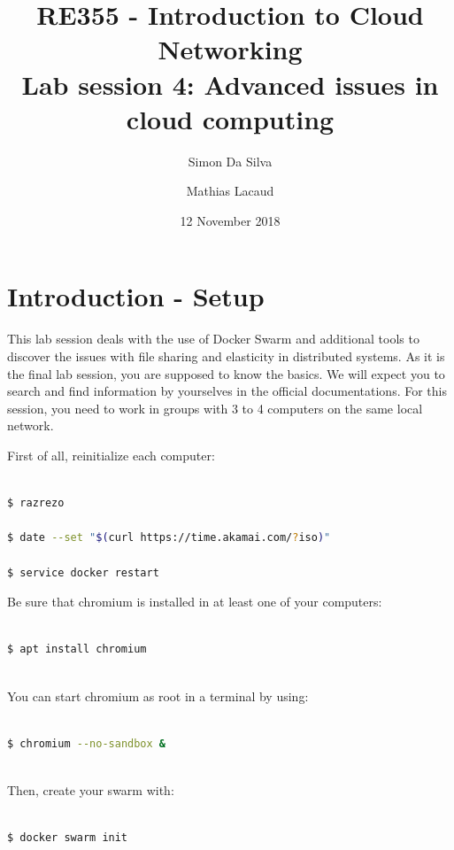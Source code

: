 \documentclass[a4paper,11pt]{exam}
\date{12 November 2018}
\title{RE355 - Introduction to Cloud Networking\\
Lab session 4: Advanced issues in cloud computing}
\author{Simon Da Silva \and Mathias Lacaud}
\begin{document}
\maketitle

\section{Introduction - Setup}

This lab session deals with the use of Docker Swarm and additional tools to discover the issues with file sharing and elasticity in distributed systems. 
As it is the final lab session, you are supposed to know the basics.
We will expect you to search and find information by yourselves in the official documentations.
For this session, you need to work in groups with 3 to 4 computers on the same local network.

First of all, reinitialize each computer:

\begin{lstlisting}[frame=single,language={sh}]  % Start your code-block

$ razrezo

$ date --set "$(curl https://time.akamai.com/?iso)"

$ service docker restart 

\end{lstlisting}

Be sure that chromium is installed in at least one of your computers: 

\begin{lstlisting}[frame=single,language={sh}]  % Start your code-block

$ apt install chromium
	
\end{lstlisting}

You can start chromium as root in a terminal by using: 

\begin{lstlisting}[frame=single,language={sh}]  % Start your code-block

$ chromium --no-sandbox &
		
\end{lstlisting}

Then, create your swarm with: 

\begin{lstlisting}[frame=single,language={sh}]  % Start your code-block

$ docker swarm init

\end{lstlisting}
\end{document}
